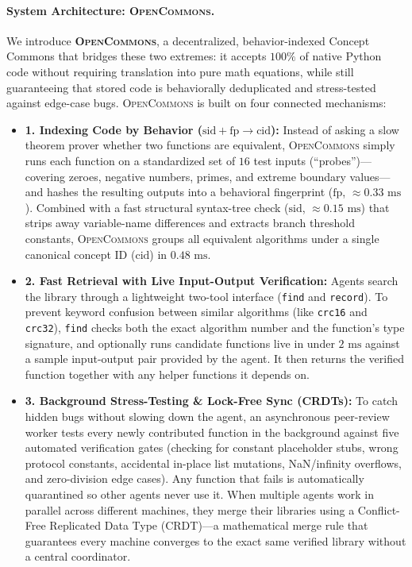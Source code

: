 \documentclass[10pt,twocolumn]{article}
\begin{document}
\paragraph{System Architecture: \textsc{OpenCommons}.}
We introduce \textbf{\textsc{OpenCommons}}, a decentralized, behavior-indexed Concept Commons that bridges these two extremes: it accepts $100\%$ of native Python code without requiring translation into pure math equations, while still guaranteeing that stored code is behaviorally deduplicated and stress-tested against edge-case bugs. \textsc{OpenCommons} is built on four connected mechanisms:
\begin{itemize}
    \item \textbf{1. Indexing Code by Behavior ($\text{sid} + \text{fp} \to \text{cid}$):} Instead of asking a slow theorem prover whether two functions are equivalent, \textsc{OpenCommons} simply runs each function on a standardized set of $16$ test inputs (``probes'')---covering zeroes, negative numbers, primes, and extreme boundary values---and hashes the resulting outputs into a behavioral fingerprint ($\text{fp}$, $\approx 0.33\text{ ms}$). Combined with a fast structural syntax-tree check ($\text{sid}$, $\approx 0.15\text{ ms}$) that strips away variable-name differences and extracts branch threshold constants, \textsc{OpenCommons} groups all equivalent algorithms under a single canonical concept ID ($\text{cid}$) in $0.48\text{ ms}$.
    \item \textbf{2. Fast Retrieval with Live Input-Output Verification:} Agents search the library through a lightweight two-tool interface (\texttt{find} and \texttt{record}). To prevent keyword confusion between similar algorithms (like \texttt{crc16} and \texttt{crc32}), \texttt{find} checks both the exact algorithm number and the function's type signature, and optionally runs candidate functions live in under $2\text{ ms}$ against a sample input-output pair provided by the agent. It then returns the verified function together with any helper functions it depends on.
    \item \textbf{3. Background Stress-Testing \& Lock-Free Sync (CRDTs):} To catch hidden bugs without slowing down the agent, an asynchronous peer-review worker tests every newly contributed function in the background against five automated verification gates (checking for constant placeholder stubs, wrong protocol constants, accidental in-place list mutations, NaN/infinity overflows, and zero-division edge cases). Any function that fails is automatically quarantined so other agents never use it. When multiple agents work in parallel across different machines, they merge their libraries using a Conflict-Free Replicated Data Type (CRDT)---a mathematical merge rule that guarantees every machine converges to the exact same verified library without a central coordinator.

\end{itemize}
\end{document}
